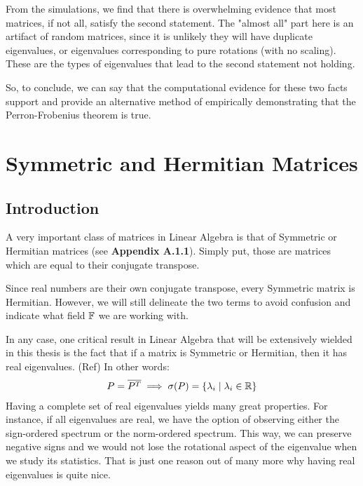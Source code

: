 From the simulations, we find that there is overwhelming evidence that most matrices, if not all, satisfy the second statement.
The "almost all" part here is an artifact of random matrices, since it is unlikely they will have duplicate eigenvalues, or eigenvalues corresponding to pure rotations (with no scaling).
These are the types of eigenvalues that lead to the second statement not holding. \newline

 So, to conclude, we can say that the computational evidence for these two facts support and provide an alternative method of empirically demonstrating that the Perron-Frobenius theorem is true.


\newpage
\section{Symmetric and Hermitian Matrices}

\subsection{Introduction}
A very important class of matrices in Linear Algebra is that of Symmetric or Hermitian matrices (see \textbf{Appendix A.1.1}). Simply put, those are matrices which are equal to their conjugate transpose.

\begin{remark}
Since real numbers are their own conjugate transpose, every Symmetric matrix is Hermitian. However, we will still delineate the two terms to avoid confusion and indicate what field $\mathbb{F}$ we are working with.
\end{remark}

In any case, one critical result in Linear Algebra that will be extensively wielded in this thesis is the fact that if a matrix is Symmetric or Hermitian, then it has real eigenvalues. (Ref) In other words:
\begin{align*}
P = \overline{P^{T}} \implies \sigma(P) = \{\lambda_i \mid \lambda_i \in \mathbb{R}\}
\end{align*}
Having a complete set of real eigenvalues yields many great properties. For instance, if all eigenvalues are real, we have the option of observing either the sign-ordered spectrum or the norm-ordered spectrum.
This way, we can preserve negative signs and we would not lose the rotational aspect of the eigenvalue when we study its statistics. That is just one reason out of many more why having real eigenvalues is quite nice.

